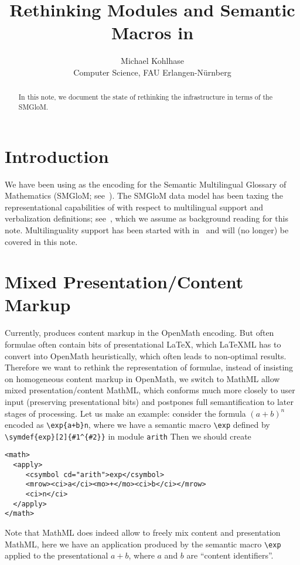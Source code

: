 \documentclass{bluenote}
\title{Rethinking Modules and Semantic Macros in \protect\sTeX}
\author{Michael Kohlhase\\Computer Science, FAU Erlangen-N\"urnberg}
\def\smglom{\textsf{SMGloM}\xspace}
\def\latexml{{\LaTeX}ML\xspace}
\begin{document}
\maketitle
\begin{abstract}
  In this note, we document the state of rethinking the \sTeX infrastructure in terms of
  the \smglom.
\end{abstract}

\section{Introduction}
We have been using \sTeX as the encoding for the Semantic Multilingual Glossary of
Mathematics (\smglom; see~\cite{IanJucKoh:sps14}). The \smglom data model has been taxing
the representational capabilities of \sTeX with respect to multilingual support and
verbalization definitions; see~\cite{Kohlhase:dmesmgm14}, which we assume as background
reading for this note. Multilinguality support has been started with
in~\cite{KohGin:smss:svn} and will (no longer) be covered in this note.

\section{Mixed Presentation/Content Markup}
Currently, \sTeX produces content markup in the OpenMath encoding. But often \sTeX
formulae often contain bits of presentational {\LaTeX}, which \latexml has to convert into
OpenMath heuristically, which often leads to non-optimal results. Therefore we want to
rethink the representation of formulae, instead of insisting on homogeneous content markup
in OpenMath, we switch to MathML allow mixed presentation/content MathML, which conforms
much more closely to user input (preserving presentational bits) and postpones full
semantification to later stages of processing. Let us make an example: consider the
formula $(a+b)^n$ encoded as \lstinline|\exp{a+b}n|, where we have a semantic macro
\lstinline|\exp| defined by \lstinline|\symdef{exp}[2]{#1^{#2}}| in module
\lstinline|arith| Then we should create
\begin{lstlisting}[language=MathML]
<math>
  <apply>
     <csymbol cd="arith">exp</csymbol>
     <mrow><ci>a</ci><mo>+</mo><ci>b</ci></mrow>
     <ci>n</ci>
  </apply>
</math>
\end{lstlisting}
Note that MathML does indeed allow to freely mix content and presentation MathML, here we
have an application produced by the semantic macro \lstinline|\exp| applied to the
presentational $a+b$, where $a$ and $b$ are ``content identifiers''. 
\end{document}

